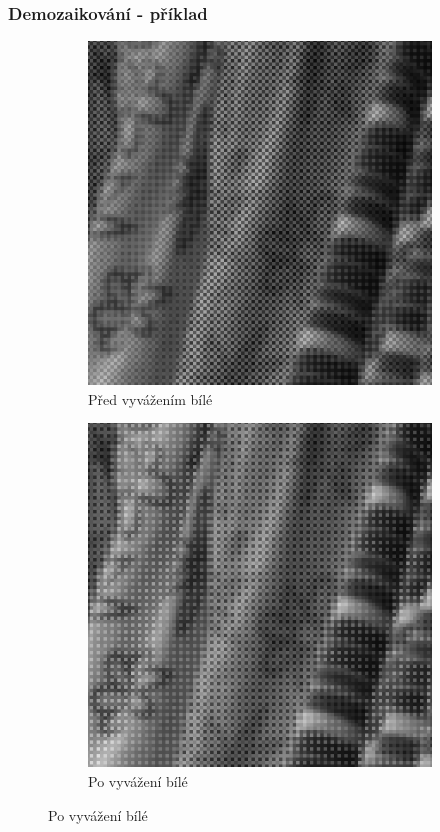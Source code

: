 \documentclass{beamer}
\begin{document}
	
	\begin{frame}[t,fragile]
		\frametitle{Demozaikování - příklad}	
		
				
		\begin{figure}[htbp]
        \centering

        \begin{subfigure}[b]{0.32\textwidth}
                \includegraphics[width=\textwidth]{e_nonwb.png}
                \caption{\scriptsize{Před vyvážením bílé}}
        \end{subfigure}   
        \begin{subfigure}[b]{0.32\textwidth}
                \includegraphics[width=\textwidth]{e_wb.png}
                \caption{\scriptsize{Po vyvážení bílé}}


\end{subfigure}
\end{figure}
\end{frame}
\end{document}
